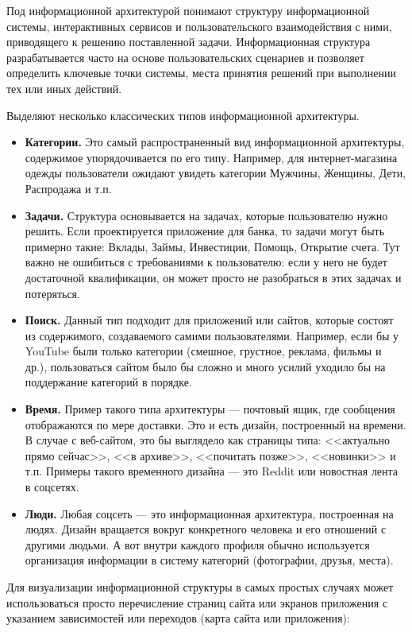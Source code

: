 \documentclass{../../text-style}
\begin{document}
Под информационной архитектурой понимают структуру информационной системы, интерактивных сервисов и пользовательского взаимодействия с ними, приводящего к решению поставленной задачи. Информационная структура разрабатывается часто на основе пользовательских сценариев и позволяет определить ключевые точки системы, места принятия решений при выполнении тех или иных действий.

Выделяют несколько классических типов информационной архитектуры.

\begin{itemize}
    \item \textbf{Категории.} Это самый распространенный вид информационной архитектуры, содержимое упорядочивается по его типу. Например, для интернет-магазина одежды пользователи ожидают увидеть категории Мужчины, Женщины, Дети, Распродажа и т.п.
    \item \textbf{Задачи.} Структура основывается на задачах, которые пользователю нужно решить. Если проектируется приложение для банка, то задачи могут быть примерно такие: Вклады, Займы, Инвестиции, Помощь, Открытие счета. Тут важно не ошибиться с требованиями к пользователю: если у него не будет достаточной квалификации, он может просто не разобраться в этих задачах и потеряться.
    \item \textbf{Поиск.} Данный тип подходит для приложений или сайтов, которые состоят из содержимого, создаваемого самими пользователями. Например, если бы у YouTube были только категории (смешное, грустное, реклама, фильмы и др.), пользоваться сайтом было бы сложно и много усилий уходило бы на поддержание категорий в порядке.
    \item \textbf{Время.} Пример такого типа архитектуры --- почтовый ящик, где сообщения отображаются по мере доставки. Это и есть дизайн, построенный на времени. В случае с веб-сайтом, это бы выглядело как страницы типа: <<актуально прямо сейчас>>, <<в архиве>>, <<почитать позже>>, <<новинки>> и т.п. Примеры такого временного дизайна --- это Reddit или новостная лента в соцсетях.
    \item \textbf{Люди.} Любая соцсеть --- это информационная архитектура, построенная на людях. Дизайн вращается вокруг конкретного человека и его отношений с другими людьми. А вот внутри каждого профиля обычно используется организация информации в систему категорий (фотографии, друзья, места).
\end{itemize}

Для визуализации информационной структуры в самых простых случаях может использоваться просто перечисление страниц сайта или экранов приложения с указанием зависимостей или переходов (карта сайта или приложения):
\end{document}
